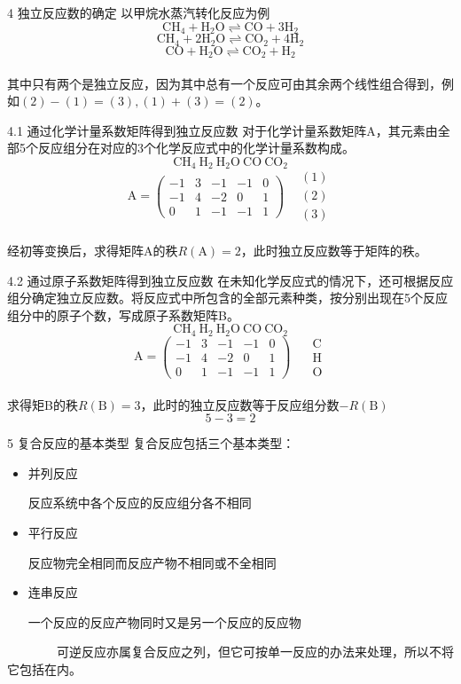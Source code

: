 \begin{frame}{4 独立反应数的确定}
	以甲烷水蒸汽转化反应为例
	$$\mathrm{CH_4+H_2O\rightleftharpoons CO+3H_2}$$
	$$\mathrm{CH_4+2H_2O\rightleftharpoons CO_2+4H_2}$$
	$$\mathrm{CO+H_2O\rightleftharpoons CO_2+H_2}$$
	\\其中只有两个是独立反应，因为其中总有一个反应可由其余两个线性组合得到，例如$(2)-(1)=(3),(1)+(3)=(2)$。
\end{frame}


\begin{frame}{4.1 通过化学计量系数矩阵得到独立反应数}
	对于化学计量系数矩阵A，其元素由全部5个反应组分在对应的3个化学反应式中的化学计量系数构成。
	$$\mathrm{CH_4~H_2~H_2O~CO~CO_2}$$
	$$\mathrm{A} = \begin{pmatrix}
	-1&  3&  -1&  -1& 0\\
	-1&  4&  -2&  0& 1\\
	0&  1&  -1&  -1& 1
\end{pmatrix}~~~~
\begin{matrix}
	(1)\\
	(2)\\
	(3)
\end{matrix}$$
	\\经初等变换后，求得矩阵A的秩$R(\mathrm{A})=2$，此时独立反应数等于矩阵的秩。
\end{frame}


\begin{frame}{4.2 通过原子系数矩阵得到独立反应数}
	在未知化学反应式的情况下，还可根据反应组分确定独立反应数。将反应式中所包含的全部元素种类，按分别出现在5个反应组分中的原子个数，写成原子系数矩阵B。
	$$\mathrm{CH_4~H_2~H_2O~CO~CO_2}$$
	$$\mathrm{A} = \begin{pmatrix}
		-1&  3&  -1&  -1& 0\\
		-1&  4&  -2&  0& 1\\
		0&  1&  -1&  -1& 1
	\end{pmatrix}~~~~~~ 
	\begin{matrix}
		\mathrm{C}\\
		\mathrm{H}\\
		\mathrm{O}
	\end{matrix}$$
	\\求得矩B的秩$R(\mathrm{B})=3$，此时的独立反应数等于反应组分数$-R(\mathrm{B})$
	$$5-3=2$$
	\end{frame}


\begin{frame}{5 复合反应的基本类型}
	复合反应包括三个基本类型：
	\begin{itemize}
		\item[\bullet ] 并列反应\par 反应系统中各个反应的反应组分各不相同
		\item[\bullet ] 平行反应\par 反应物完全相同而反应产物不相同或不全相同
		\item[\bullet ] 连串反应\par 一个反应的反应产物同时又是另一个反应的反应物
	\end{itemize}
	~~~~~~~~可逆反应亦属复合反应之列，但它可按单一反应的办法来处理，所以不将它包括在内。
\end{frame}


